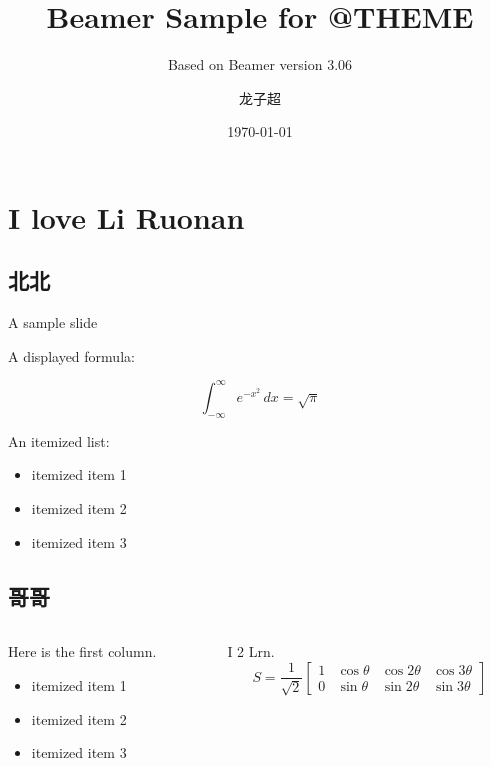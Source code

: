 \documentclass[xcolor=dvipsnames]{beamer}
\begin{document}
\title[Beamer Sample]{Beamer Sample for @THEME}
\subtitle[Beamer ver 3.06]{Based on Beamer version 3.06}
\author{龙子超}
\date{\today}
\begin{frame}[plain] 
  \titlepage
\end{frame}

\begin{frame}
  \tableofcontents%
\end{frame}
\section{I love Li Ruonan}
\subsection{北北}
\begin{frame}{A sample slide}

  A displayed formula:

  \[
    \int_{-\infty}^\infty e^{-x^2} \, dx = \sqrt{\pi}
  \]

  An itemized list:

  \begin{itemize}
    \item itemized item 1
      \pause
    \item itemized item 2
      \pause
    \item itemized item 3
  \end{itemize}

\end{frame}
\subsection{哥哥}
\begin{frame}

  \begin{columns}[t]
    \begin{column}{0.4\textwidth}
      Here is the first column. 
      \begin{itemize}
        \item itemized item 1
        \item itemized item 2
        \item itemized item 3
      \end{itemize}
    \end{column}
    \pause
    \begin{column}{0.5\textwidth}
      I 2 Lrn.
      \[
        S=\frac{1}{\sqrt{2}}\left[
          \begin{array}{cccc}
            1&\cos\theta&\cos2\theta&\cos3\theta\\
            0&\sin\theta&\sin2\theta&\sin3\theta
        \end{array}\right]
      \]
    \end{column}
  \end{columns}

\end{frame}
\end{document}
